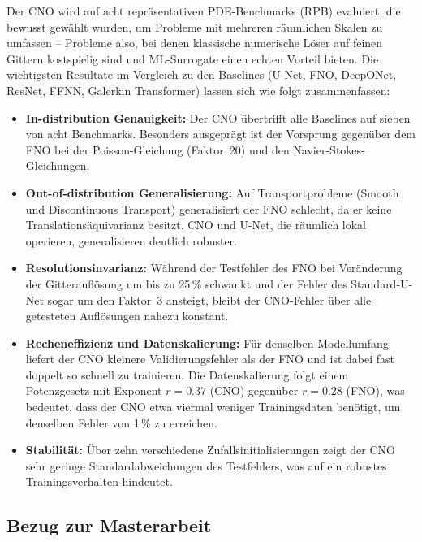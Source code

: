 \documentclass[a4paper,12pt]{article}
\begin{document}
Der CNO wird auf acht repr\"asentativen PDE-Benchmarks (RPB) evaluiert, die
bewusst gew\"ahlt wurden, um Probleme mit mehreren r\"aumlichen Skalen zu
umfassen -- Probleme also, bei denen klassische numerische L\"oser auf feinen
Gittern kostspielig sind und ML-Surrogate einen echten Vorteil bieten.
Die wichtigsten Resultate im Vergleich zu den Baselines (U-Net, FNO,
DeepONet, ResNet, FFNN, Galerkin Transformer) lassen sich wie folgt
zusammenfassen:

\begin{itemize}
  \item \textbf{In-distribution Genauigkeit:} Der CNO \"ubertrifft alle
    Baselines auf sieben von acht Benchmarks. Besonders ausgepr\"agt ist der
    Vorsprung gegen\"uber dem FNO bei der Poisson-Gleichung (Faktor~20) und
    den Navier-Stokes-Gleichungen.

  \item \textbf{Out-of-distribution Generalisierung:} Auf Transportprobleme
    (Smooth und Discontinuous Transport) generalisiert der FNO schlecht, da er
    keine Translationsäquivarianz besitzt. CNO und U-Net, die r\"aumlich
    lokal operieren, generalisieren deutlich robuster.

  \item \textbf{Resolutionsinvarianz:} W\"ahrend der Testfehler des FNO bei
    Ver\"anderung der Gitteraufl\"osung um bis zu 25\,\% schwankt und der
    Fehler des Standard-U-Net sogar um den Faktor~3 ansteigt, bleibt der
    CNO-Fehler \"uber alle getesteten Aufl\"osungen nahezu konstant.

  \item \textbf{Recheneffizienz und Datenskalierung:} F\"ur denselben
    Modellumfang liefert der CNO kleinere Validierungsfehler als der FNO und
    ist dabei fast doppelt so schnell zu trainieren. Die Datenskalierung folgt
    einem Potenzgesetz mit Exponent $r = 0.37$ (CNO) gegen\"uber $r = 0.28$
    (FNO), was bedeutet, dass der CNO etwa viermal weniger Trainingsdaten
    ben\"otigt, um denselben Fehler von 1\,\% zu erreichen.

  \item \textbf{Stabilit\"at:} \"Uber zehn verschiedene Zufallsinitialisierungen
    zeigt der CNO sehr geringe Standardabweichungen des Testfehlers, was auf
    ein robustes Trainingsverhalten hindeutet.
\end{itemize}

\subsection*{Bezug zur Masterarbeit}
\end{document}
